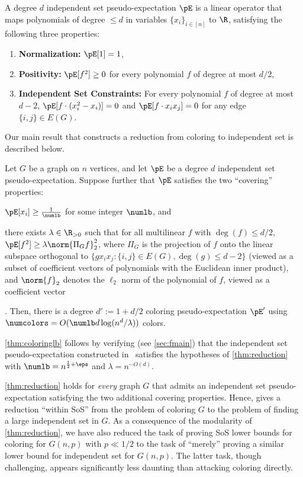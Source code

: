 \begin{definition}
A degree $d$ independent set pseudo-expectation $\pE$ is a linear operator that maps polynomials of degree $\leq d$ in variables $\{x_i\}_{i \in[n]}$ to $\R$, satisfying the following three properties:
\begin{enumerate}
	\item \textbf{Normalization: } $\pE[1]  = 1$,
	\item \textbf{Positivity: } $\pE[f^2] \geq 0$ for every polynomial $f$ of degree at most $d/2$,
	\item \textbf{Independent Set Constraints:} For every polynomial $f$ of degree at most $d-2$, $\pE[f \cdot (x_{i}^2 - x_{i})] = 0$ and $\pE[f \cdot x_{i} x_{j}] = 0$ for any edge $\{i,j\} \in E(G)$.
	\end{enumerate}
\end{definition}

Our main result that constructs a reduction from coloring to independent set is described below.
\begin{mtheorem}
\label{thm:reduction}
Let $G$ be a graph on $n$ vertices, and let $\pE$ be a degree $d$ independent set pseudo-expectation. Suppose further that $\pE$ satisfies the two ``covering'' properties: \begin{inparaenum}[(1)] \item $\pE[x_i] \geq \frac{1}{\numlb}$ for some integer $\numlb$, and \item there exists $\lambda \in \R_{> 0}$ such that for all multilinear $f$ with $\deg(f) \leq d/2$, $\pE[f^2] \geq \lambda \norm{\Pi_G f}_2^2$, where $\Pi_G$ is the projection of $f$ onto the linear subspace orthogonal to $\{g x_i x_j : \{i,j\} \in E(G), \deg(g) \leq d-2\}$ (viewed as a subset of coefficient vectors of polynomials with the Euclidean inner product), and $\norm{f}_2$ denotes the $\ell_2$ norm of the polynomial of $f$, viewed as a coefficient vector\end{inparaenum}. 
Then, there is a degree $d' := 1 + d/2$ coloring pseudo-expectation $\pE'$ using $\numcolors = O(\numlb d \log (n^d/\lambda))$ colors.
\end{mtheorem}
\cref{thm:coloringlb} follows by verifying (see \cref{sec:fmain}) that the independent set pseudo-expectation constructed in~\cite{DBLP:conf/focs/BarakHKKMP16} satisfies the hypotheses of \cref{thm:reduction} with $\numlb = n^{\frac{1}{2} + \eps}$ and $\lambda = n^{-O(d)}$.

\cref{thm:reduction} holds for \emph{every} graph $G$ that admits an independent set pseudo-expectation satisfying the two additional covering properties. Hence,  gives a reduction ``within SoS'' from the problem of coloring $G$ to the problem of finding a large independent set in $G$. As a consequence of the modularity of \cref{thm:reduction}, we have also reduced the task of proving SoS lower bounds for coloring for $G(n,p)$ with $p \ll 1/2$ to the task of ``merely'' proving a similar lower bound for independent set for $G(n,p)$. The latter task, though challenging, appears significantly less daunting than attacking coloring directly. 

